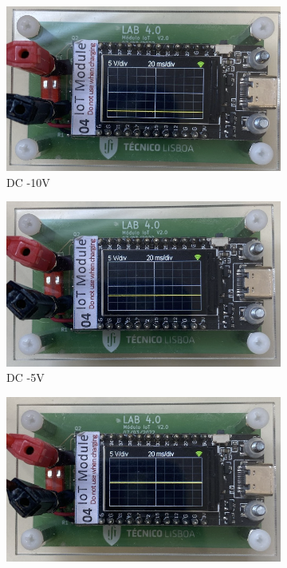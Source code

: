 \begin{figure}[H]
    \centering
    \begin{subfigure}{0.35\textwidth}
        \centering
        \includegraphics[width=1\linewidth]{Imagens/Testes no laboratório/Não calibrado/DC -10V.png}
        \captionsetup{justification=centering}
        \caption{DC -10V}
        \label{fig:DC -10V não calibrado}
    \end{subfigure}
    \begin{subfigure}{0.35\textwidth}
        \centering
        \includegraphics[width=1\linewidth]{Imagens/Testes no laboratório/Não calibrado/DC -5V.png}
        \captionsetup{justification=centering}
        \caption{DC -5V}
        \label{fig:DC -5V não calibrado}
    \end{subfigure}
    \begin{subfigure}{0.35\textwidth}
        \centering
        \includegraphics[width=1\linewidth]{Imagens/Testes no laboratório/Não calibrado/DC 0V.png}

\end{subfigure}
\end{figure}
